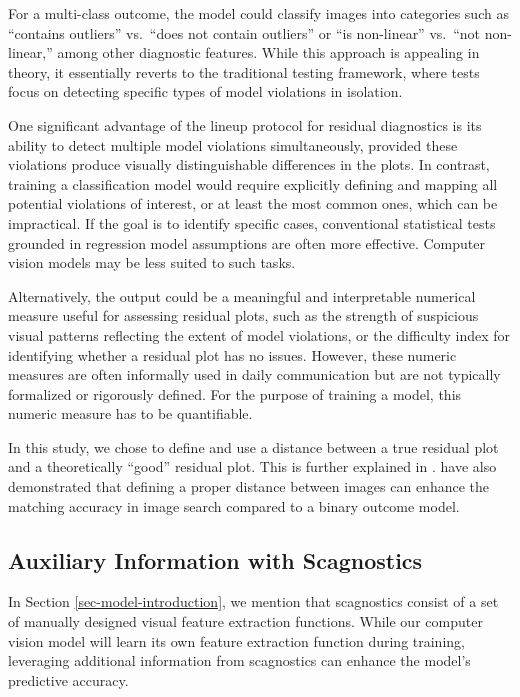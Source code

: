 \documentclass[]{interact}
\theoremstyle{plain}%
\theoremstyle{definition}
\theoremstyle{remark}
\begin{document}
For a multi-class outcome, the model could classify images into
categories such as ``contains outliers'' vs.~``does not contain
outliers'' or ``is non-linear'' vs.~``not non-linear,'' among other
diagnostic features. While this approach is appealing in theory, it
essentially reverts to the traditional testing framework, where tests
focus on detecting specific types of model violations in isolation.

One significant advantage of the lineup protocol for residual
diagnostics is its ability to detect multiple model violations
simultaneously, provided these violations produce visually
distinguishable differences in the plots. In contrast, training a
classification model would require explicitly defining and mapping all
potential violations of interest, or at least the most common ones,
which can be impractical. If the goal is to identify specific cases,
conventional statistical tests grounded in regression model assumptions
are often more effective. Computer vision models may be less suited to
such tasks.

Alternatively, the output could be a meaningful and interpretable
numerical measure useful for assessing residual plots, such as the
strength of suspicious visual patterns reflecting the extent of model
violations, or the difficulty index for identifying whether a residual
plot has no issues. However, these numeric measures are often informally
used in daily communication but are not typically formalized or
rigorously defined. For the purpose of training a model, this numeric
measure has to be quantifiable.

In this study, we chose to define and use a distance between a true
residual plot and a theoretically ``good'' residual plot. This is
further explained in \citet{sec-model-distance-between-residual-plots}.
\citet{vo2016localizing} have also demonstrated that defining a proper
distance between images can enhance the matching accuracy in image
search compared to a binary outcome model.

\subsection{Auxiliary Information with
Scagnostics}\label{auxiliary-information-with-scagnostics}

In Section \ref{sec-model-introduction}, we mention that scagnostics
consist of a set of manually designed visual feature extraction
functions. While our computer vision model will learn its own feature
extraction function during training, leveraging additional information
from scagnostics can enhance the model's predictive accuracy.
\end{document}

